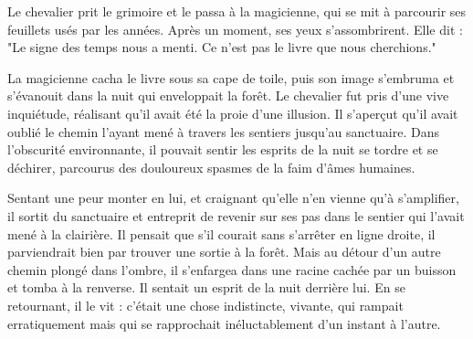 \documentclass[a4paper,11pt, openany]{book}
\begin{document}
Le chevalier prit le grimoire et le passa à la magicienne, qui se mit à parcourir ses feuillets usés par les années. Après un moment, ses yeux s'assombrirent. Elle dit :
"Le signe des temps nous a menti. Ce n'est pas le livre que nous cherchions."

La magicienne cacha le livre sous sa cape de toile, puis son image s'embruma et s'évanouit dans la nuit qui enveloppait la forêt.
Le chevalier fut pris d'une vive inquiétude, réalisant qu'il avait été la proie d'une illusion. 
Il s'aperçut qu'il avait oublié le chemin l'ayant mené à travers les sentiers jusqu'au sanctuaire. 
Dans l'obscurité environnante, il pouvait sentir les esprits de la nuit se tordre et se déchirer, 
parcourus des douloureux spasmes de la faim d'âmes humaines.

Sentant une peur monter en lui, et craignant qu'elle n'en vienne qu'à s'amplifier, 
il sortit du sanctuaire et entreprit de revenir sur ses pas dans le sentier qui l'avait mené à la clairière.
Il pensait que s'il courait sans s'arrêter en ligne droite, il parviendrait bien par trouver une sortie à la forêt.
Mais au détour d'un autre chemin plongé dans l'ombre, il s'enfargea dans une racine cachée par un buisson et tomba à la renverse.
Il sentait un esprit de la nuit derrière lui. En se retournant, il le vit : c'était une chose indistincte, vivante, qui rampait erratiquement mais qui se rapprochait inéluctablement d'un instant à l'autre.
\end{document}
